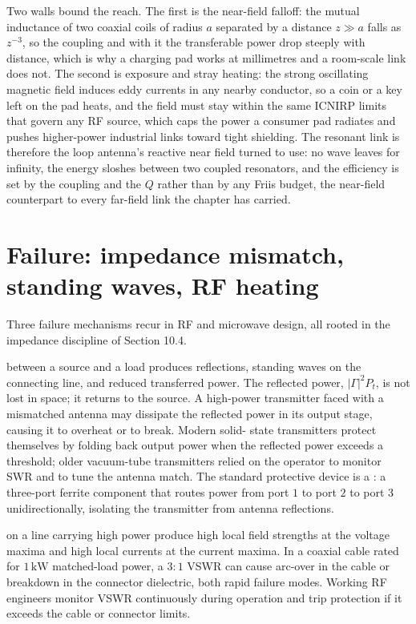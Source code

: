 Two walls bound the reach. The first is the near-field falloff: the mutual
inductance of two coaxial coils of radius $a$ separated by a distance $z\gg
a$ falls as $z^{-3}$, so the coupling and with it the transferable power
drop steeply with distance, which is why a charging pad works at
millimetres and a room-scale link does not. The second is exposure and
stray heating: the strong oscillating magnetic field induces eddy currents
in any nearby conductor, so a coin or a key left on the pad heats, and the
field must stay within the same ICNIRP limits that govern any RF source,
which caps the power a consumer pad radiates and pushes higher-power
industrial links toward tight shielding. The resonant link is therefore the
loop antenna's reactive near field turned to use: no wave leaves for
infinity, the energy sloshes between two coupled resonators, and the
efficiency is set by the coupling and the $Q$ rather than by any Friis
budget, the near-field counterpart to every far-field link the chapter has
carried.

\section{Failure: impedance mismatch, standing waves, RF heating}

Three failure mechanisms recur in RF and microwave design, all rooted
in the impedance discipline of Section 10.4.

 between a source and a load produces
reflections, standing waves on the connecting line, and reduced
transferred power. The reflected power, $|\Gamma|^{2}P_{t}$, is not
lost in space; it returns to the source. A high-power transmitter
faced with a mismatched antenna may dissipate the reflected power in
its output stage, causing it to overheat or to break. Modern solid-
state transmitters protect themselves by folding back output power
when the reflected power exceeds a threshold; older vacuum-tube
transmitters relied on the operator to monitor SWR and to tune the
antenna match. The standard protective device is a
: a three-port ferrite component that routes
power from port $1$ to port $2$ to port $3$ unidirectionally,
isolating the transmitter from antenna reflections.

 on a line carrying high power produce high
local field strengths at the voltage maxima and high local currents
at the current maxima. In a coaxial cable rated for $1\,\si{\kilo
\watt}$ matched-load power, a $3:1$ VSWR can cause arc-over in the
cable or breakdown in the connector dielectric, both rapid failure
modes. Working RF engineers monitor VSWR continuously during operation
and trip protection if it exceeds the cable or connector limits.

